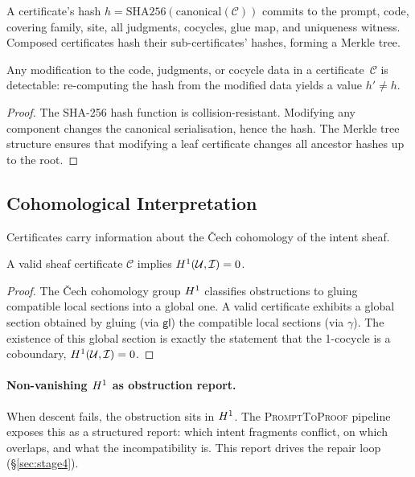 \documentclass[11pt]{article}
\newcommand{\PromptToProof}{\textsc{PromptToProof}}
\newcommand{\IntentSheaf}{\mathcal{I}}
\newcommand{\ProofCert}{\mathcal{C}}
\newcommand{\CoverFam}{\mathcal{U}}
\newcommand{\Cocycle}{\gamma}
\newcommand{\GlueMap}{\mathsf{gl}}
\begin{document}
\begin{definition}\label{def:hash-chain}
A certificate's hash $h = \mathrm{SHA256}(\mathrm{canonical}(\ProofCert))$
commits to the prompt, code, covering family, site, all judgments,
cocycles, glue map, and uniqueness witness.  Composed certificates hash
their sub-certificates' hashes, forming a Merkle tree.
\end{definition}

\begin{lemma}\label{lem:tamper}
Any modification to the code, judgments, or cocycle data in a
certificate~$\ProofCert$ is detectable: re-computing the hash from the
modified data yields a value $h' \neq h$.
\end{lemma}

\begin{proof}
The SHA-256 hash function is collision-resistant.  Modifying any
component changes the canonical serialisation, hence the hash.
The Merkle tree structure ensures that modifying a leaf certificate
changes all ancestor hashes up to the root.
\end{proof}

\subsection{Cohomological Interpretation}\label{sec:cohomology}

Certificates carry information about the \v{C}ech cohomology of
the intent sheaf.

\begin{proposition}\label{prop:h1-vanish}
A valid sheaf certificate $\ProofCert$ implies
$\Hcoh{1}(\CoverFam, \IntentSheaf) = 0$.
\end{proposition}

\begin{proof}
The \v{C}ech cohomology group $H^{1}$ classifies obstructions
to gluing compatible local sections into a global one.  A valid
certificate exhibits a global section obtained by gluing (via
$\GlueMap$) the compatible local sections (via $\Cocycle$).
The existence of this global section is exactly the statement that
the 1-cocycle is a coboundary, \ie
$\Hcoh{1}(\CoverFam, \IntentSheaf) = 0$.
\end{proof}

\paragraph{Non-vanishing $H^{1}$ as obstruction report.}
When descent fails, the obstruction sits in $H^{1}$.  The
\PromptToProof{} pipeline exposes this as a structured report: which
intent fragments conflict, on which overlaps, and what the
incompatibility is.  This report drives the repair loop
(§\ref{sec:stage4}).
\end{document}
